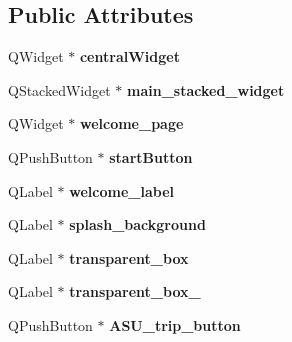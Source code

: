 \subsection*{Public Attributes}
\begin{DoxyCompactItemize}
\item 
\mbox{\label{class_ui___main_window_a30075506c2116c3ed4ff25e07ae75f81}} 
Q\+Widget $\ast$ {\bfseries central\+Widget}
\item 
\mbox{\label{class_ui___main_window_a40109d34201b8ce0fe88bfcf2e56132c}} 
Q\+Stacked\+Widget $\ast$ {\bfseries main\+\_\+stacked\+\_\+widget}
\item 
\mbox{\label{class_ui___main_window_a8e4a8ffa90ddd4d78904fa36224ca803}} 
Q\+Widget $\ast$ {\bfseries welcome\+\_\+page}
\item 
\mbox{\label{class_ui___main_window_a58a84cd3057ab5459819f986b08942b1}} 
Q\+Push\+Button $\ast$ {\bfseries start\+Button}
\item 
\mbox{\label{class_ui___main_window_a4b5f6bad4de9498da2347576375c85e5}} 
Q\+Label $\ast$ {\bfseries welcome\+\_\+label}
\item 
\mbox{\label{class_ui___main_window_a3c7da08ee61ff46bbf09a4adca920abb}} 
Q\+Label $\ast$ {\bfseries splash\+\_\+background}
\item 
\mbox{\label{class_ui___main_window_ad9b9feb723ff2f77feaf7baf581f493c}} 
Q\+Label $\ast$ {\bfseries transparent\+\_\+box}
\item 
\mbox{\label{class_ui___main_window_a9d2152dcebcac8e194ab28b061ba8121}} 
Q\+Label $\ast$ {\bfseries transparent\+\_\+box\+\_}
\item 
\mbox{\label{class_ui___main_window_af4dccd8fafaacd32cfb5628a5f0dd951}} 
Q\+Push\+Button $\ast$ {\bfseries A\+S\+U\+\_\+trip\+\_\+button}
\item 
\mbox{\label{class_ui___main_window_aadb1a0d290c8d63116bcdf62d9f17438}} 

\end{DoxyCompactItemize}
